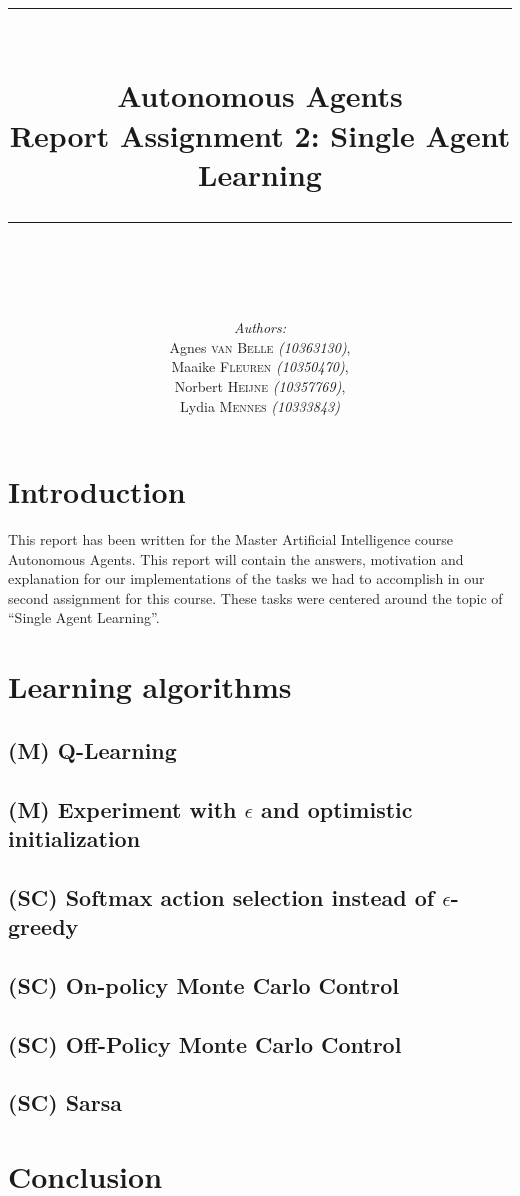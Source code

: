 \documentclass{article}
\newcommand{\HRule}{\rule{\linewidth}{0.1mm}}
\begin{document}
\title{ \HRule \\[0.2cm]
		Autonomous Agents\\ 
		Report Assignment 2: Single Agent Learning\\
		\HRule \\[0.1cm]
		}
		
\author{
		\emph{Authors:}\\[0.2cm]
		Agnes \textsc{van Belle} \small{ \emph{(10363130)}},\\ 
		Maaike \textsc{Fleuren} \small{ \emph{(10350470)}}, \\
		Norbert \textsc{Heijne} \small{ \emph{(10357769)}}, \\
		Lydia \textsc{Mennes} \small{ \emph{(10333843)}}
		}
		
\maketitle

\section{Introduction}
This report has been written for the Master Artificial Intelligence course Autonomous Agents. This report will contain the answers, motivation and explanation for our implementations of the tasks we had to accomplish in our second assignment for this course. These tasks were centered around the topic of ``Single Agent Learning''. 

\section{Learning algorithms}
\subsection{(M) Q-Learning}
\subsection{(M) Experiment with $\epsilon$ and optimistic initialization}
\subsection{(SC) Softmax action selection instead of $\epsilon$-greedy}
\subsection{(SC) On-policy Monte Carlo Control}
\subsection{(SC) Off-Policy Monte Carlo Control}
\subsection{(SC) Sarsa}

\section{Conclusion}
\end{document}
